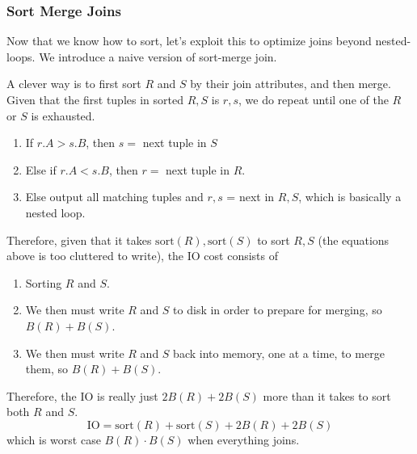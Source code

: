 \documentclass{article}
\begin{document}
    \subsubsection{Sort Merge Joins}

      Now that we know how to sort, let's exploit this to optimize joins beyond nested-loops. We introduce a naive version of sort-merge join. 

      \begin{algo}
        A clever way is to first sort $R$ and $S$ by their join attributes, and then merge. Given that the first tuples in sorted $R, S$ is $r, s$, we do repeat until one of the $R$ or $S$ is exhausted. 
        \begin{enumerate}
          \item If $r.A > s.B$, then $s =$ next tuple in $S$ 
          \item Else if $r.A < s.B$, then $r =$ next tuple in $R$. 
          \item Else output all matching tuples and $r, s$ = next in $R, S$, which is basically a nested loop. 
        \end{enumerate}
        Therefore, given that it takes $\mathrm{sort}(R), \mathrm{sort}(S)$ to sort $R, S$ (the equations above is too cluttered to write), the IO cost consists of
        \begin{enumerate}
          \item Sorting $R$ and $S$. 
          \item We then must write $R$ and $S$ to disk in order to prepare for merging, so $B(R) + B(S)$. 
          \item We then must write $R$ and $S$ back into memory, one at a time, to merge them, so $B(R) + B(S)$. 
        \end{enumerate}
        Therefore, the IO is really just $2 B(R) + 2 B(S)$ more than it takes to sort both $R$ and $S$. 
        \begin{equation}
          \mathrm{IO} = \mathrm{sort}(R) + \mathrm{sort}(S) + 2 B(R) + 2 B(S)
        \end{equation}
        which is worst case $B(R) \cdot B(S)$ when everything joins. 
        \begin{algorithm}[H]
          \caption{}
          \label{alg:}
          \begin{algorithmic}
            \Require{}
            \State 
            \EndFunction
          \end{algorithmic}
        \end{algorithm}
      \end{algo}
\end{document}
